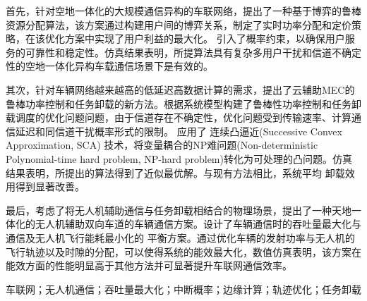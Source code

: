 首先，针对空地一体化的大规模通信异构的车联网络，提出了一种基于博弈的鲁棒资源分配算法，该方案通过构建用户间的博弈关系，制定了实时功率分配和定价策略，在该优化方案中实现了用户利益的最大化。
引入了概率约束，以确保用户服务的可靠性和稳定性。仿真结果表明，所提算法具有复杂多用户干扰和信道不确定性的空地一体化异构车载通信场景下是有效的。

其次，针对车辆网络越来越高的低延迟高数据计算的需求，提出了云辅助MEC的鲁棒功率控制和任务卸载的新方法。根据系统模型构建了鲁棒性功率控制和任务卸载调度的优化问题问题，由于信道存在不确定性，优化问题受到传输速率、计算通信延迟和同信道干扰概率形式的限制。
应用了 连续凸逼近(Successive Convex Approximation, SCA) 技术，将变量耦合的NP难问题(Non-deterministic Polynomial-time hard problem, NP-hard problem)转化为可处理的凸问题。仿真结果表明，所提出的算法得到了近似最优解。与现有方法相比，系统平均
卸载效用得到显著改善。

最后，考虑了将无人机辅助通信与任务卸载相结合的物理场景，提出了一种天地一体化的无人机辅助双向车道的车辆通信方案。设计了车辆通信时的吞吐量最大化与通信及无人机飞行能耗最小化的
平衡方案。通过优化车辆的发射功率与无人机的飞行轨迹以及时隙的分配，可以使得系统的能效最大化，数值仿真表明，该方案在能效方面的性能明显高于其他方法并可显著提升车联网通信效率。


\begin{keywords}
车联网；无人机通信；吞吐量最大化；中断概率；边缘计算；轨迹优化；任务卸载
\end{keywords}

\makeatletter
{}  \CAST@value@classification   %
\makeatother

\newpage\ \vspace{-2.5em}
\vspace{0.23cm}   %
\begin{center}
\makeatletter
{}\textbf{\CAST@value@entitle}    %
\makeatother
\end{center}

